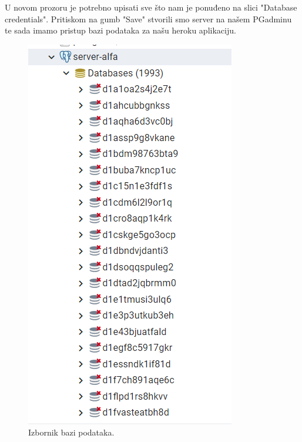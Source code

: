 			 U novom prozoru je potrebno upisati sve što nam je ponuđeno na slici  "Database credentials". Pritiskom na gumb "Save" stvorili smo server na našem PGadminu te sada imamo pristup bazi podataka za našu heroku aplikaciju.
			 \begin{figure}[H]
			 	\includegraphics[scale=0.5]{slike/Server-alfa.png} 
			 	\centering
			 	\caption{ Izbornik bazi podataka.}
			 	\label{BZP}
			 \end{figure}
			 
